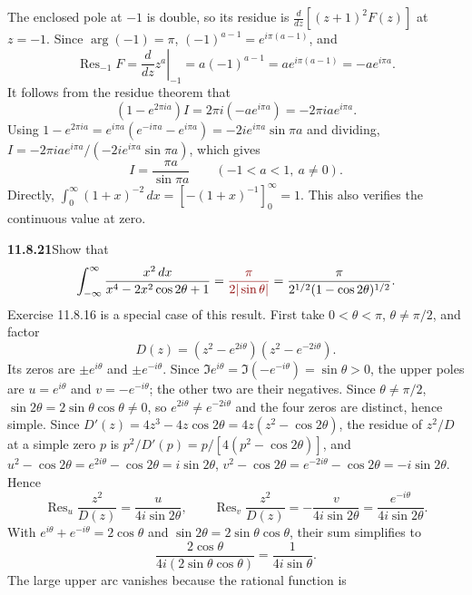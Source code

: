 The enclosed pole at $-1$ is double, so its residue is
$\frac{d}{dz}[(z+1)^2F(z)]$ at $z=-1$. Since $\arg(-1)=\pi$,
$(-1)^{a-1}=e^{i\pi(a-1)}$, and
\[
\operatorname{Res}_{-1}F
=\left.\frac{d}{dz}z^a\right|_{-1}
=a(-1)^{a-1}=a e^{i\pi(a-1)}=-a e^{i\pi a}.
\]
It follows from the residue theorem that
\[
(1-e^{2\pi ia})I=2\pi i(-a e^{i\pi a})=-2\pi i a e^{i\pi a}.
\]
Using $1-e^{2\pi ia}=e^{i\pi a}(e^{-i\pi a}-e^{i\pi a})
=-2ie^{i\pi a}\sin\pi a$ and dividing,
$I=-2\pi iae^{i\pi a}/(-2ie^{i\pi a}\sin\pi a)$, which gives
\[
\boxed{I=\frac{\pi a}{\sin\pi a}\qquad(-1<a<1,\ a\ne0)}.
\]
 Directly,
$\int_0^\infty(1+x)^{-2}\,dx=[-(1+x)^{-1}]_0^\infty=1$.
This also verifies the continuous value at zero.

\par\bigskip
\noindent\textbf{11.8.21}\quad Show that
\[
\int_{-\infty}^{\infty}\frac{x^{2}\,dx}{x^{4}-2x^{2}\cos2\theta+1}
=\erratum{\frac{\pi}{2|\sin\theta|}}
=\frac{\pi}{2^{1/2}(1-\cos2\theta)^{1/2}}.
\]
 Exercise 11.8.16 is a special case of this result.
\solution
{}
First take $0<\theta<\pi$, $\theta\ne\pi/2$, and factor
\[
D(z)=(z^2-e^{2i\theta})(z^2-e^{-2i\theta}).
\]
Its zeros are $\pm e^{i\theta}$ and $\pm e^{-i\theta}$. Since
$\Im e^{i\theta}=\Im(-e^{-i\theta})=\sin\theta>0$, the upper poles are
$u=e^{i\theta}$ and $v=-e^{-i\theta}$; the other two are their
negatives. Since $\theta\ne\pi/2$, $\sin2\theta=2\sin\theta\cos\theta\ne0$,
so $e^{2i\theta}\ne e^{-2i\theta}$ and the four zeros are distinct,
hence simple. Since $D'(z)=4z^3-4z\cos2\theta=4z(z^2-\cos2\theta)$, the
residue of $z^2/D$ at a simple zero $p$ is
$p^2/D'(p)=p/[4(p^2-\cos2\theta)]$, and
$u^2-\cos2\theta=e^{2i\theta}-\cos2\theta=i\sin2\theta$,
$v^2-\cos2\theta=e^{-2i\theta}-\cos2\theta=-i\sin2\theta$. Hence
\[
\operatorname{Res}_{u}\frac{z^2}{D(z)}
=\frac{u}{4i\sin2\theta},\qquad
\operatorname{Res}_{v}\frac{z^2}{D(z)}
=-\frac{v}{4i\sin2\theta}
=\frac{e^{-i\theta}}{4i\sin2\theta}.
\]
With $e^{i\theta}+e^{-i\theta}=2\cos\theta$ and
$\sin2\theta=2\sin\theta\cos\theta$, their sum simplifies to
\[
\frac{2\cos\theta}{4i(2\sin\theta\cos\theta)}
=\frac1{4i\sin\theta}.
\]
The large upper arc vanishes because the rational function is
